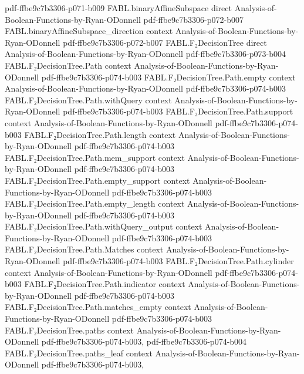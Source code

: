 \begin{theorem}
  {pdf-ffbe9c7b3306-p071-b009}
\proofstep
  {FABL.binaryAffineSubspace}
  {direct}
  {Analysis-of-Boolean-Functions-by-Ryan-ODonnell}
  {pdf-ffbe9c7b3306-p072-b007}
\proofstep
  {FABL.binaryAffineSubspace_direction}
  {context}
  {Analysis-of-Boolean-Functions-by-Ryan-ODonnell}
  {pdf-ffbe9c7b3306-p072-b007}
\proofstep
  {FABL.F₂DecisionTree}
  {direct}
  {Analysis-of-Boolean-Functions-by-Ryan-ODonnell}
  {pdf-ffbe9c7b3306-p073-b004}
\proofstep
  {FABL.F₂DecisionTree.Path}
  {context}
  {Analysis-of-Boolean-Functions-by-Ryan-ODonnell}
  {pdf-ffbe9c7b3306-p074-b003}
\proofstep
  {FABL.F₂DecisionTree.Path.empty}
  {context}
  {Analysis-of-Boolean-Functions-by-Ryan-ODonnell}
  {pdf-ffbe9c7b3306-p074-b003}
\proofstep
  {FABL.F₂DecisionTree.Path.withQuery}
  {context}
  {Analysis-of-Boolean-Functions-by-Ryan-ODonnell}
  {pdf-ffbe9c7b3306-p074-b003}
\proofstep
  {FABL.F₂DecisionTree.Path.support}
  {context}
  {Analysis-of-Boolean-Functions-by-Ryan-ODonnell}
  {pdf-ffbe9c7b3306-p074-b003}
\proofstep
  {FABL.F₂DecisionTree.Path.length}
  {context}
  {Analysis-of-Boolean-Functions-by-Ryan-ODonnell}
  {pdf-ffbe9c7b3306-p074-b003}
\proofstep
  {FABL.F₂DecisionTree.Path.mem_support}
  {context}
  {Analysis-of-Boolean-Functions-by-Ryan-ODonnell}
  {pdf-ffbe9c7b3306-p074-b003}
\proofstep
  {FABL.F₂DecisionTree.Path.empty_support}
  {context}
  {Analysis-of-Boolean-Functions-by-Ryan-ODonnell}
  {pdf-ffbe9c7b3306-p074-b003}
\proofstep
  {FABL.F₂DecisionTree.Path.empty_length}
  {context}
  {Analysis-of-Boolean-Functions-by-Ryan-ODonnell}
  {pdf-ffbe9c7b3306-p074-b003}
\proofstep
  {FABL.F₂DecisionTree.Path.withQuery_output}
  {context}
  {Analysis-of-Boolean-Functions-by-Ryan-ODonnell}
  {pdf-ffbe9c7b3306-p074-b003}
\proofstep
  {FABL.F₂DecisionTree.Path.Matches}
  {context}
  {Analysis-of-Boolean-Functions-by-Ryan-ODonnell}
  {pdf-ffbe9c7b3306-p074-b003}
\proofstep
  {FABL.F₂DecisionTree.Path.cylinder}
  {context}
  {Analysis-of-Boolean-Functions-by-Ryan-ODonnell}
  {pdf-ffbe9c7b3306-p074-b003}
\proofstep
  {FABL.F₂DecisionTree.Path.indicator}
  {context}
  {Analysis-of-Boolean-Functions-by-Ryan-ODonnell}
  {pdf-ffbe9c7b3306-p074-b003}
\proofstep
  {FABL.F₂DecisionTree.Path.matches_empty}
  {context}
  {Analysis-of-Boolean-Functions-by-Ryan-ODonnell}
  {pdf-ffbe9c7b3306-p074-b003}
\proofstep
  {FABL.F₂DecisionTree.paths}
  {context}
  {Analysis-of-Boolean-Functions-by-Ryan-ODonnell}
  {pdf-ffbe9c7b3306-p074-b003,
    pdf-ffbe9c7b3306-p074-b004}
\proofstep
  {FABL.F₂DecisionTree.paths_leaf}
  {context}
  {Analysis-of-Boolean-Functions-by-Ryan-ODonnell}
  {pdf-ffbe9c7b3306-p074-b003,
}
\end{theorem}
